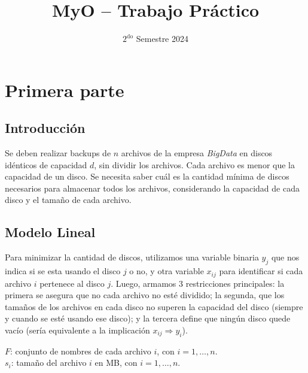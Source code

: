 \documentclass[11pt, a4paper, pdftex]{article}
\title{
	\huge MyO -- Trabajo Práctico\\
}
\author{
	\Mati \and \Xime \and \Lucifer \and \Lu
}
\date{\small $\text{2}^{\text{do}}$ Semestre 2024
}
\begin{document}
\renewcommand{\contentsname}{Contenidos}
\renewcommand{\listfigurename}{Listado de Figuras}
\renewcommand{\listtablename}{Listado de Tablas}
\renewcommand{\tablename}{Tabla}

\newcommand{\minimize}{\texttt{Minimize}\quad\,\,}
\newcommand{\maximize}{\texttt{Maximize}\quad\,\,}
\newcommand{\subjto}{\texttt{Subject to}\quad}

\maketitle

\tableofcontents

\newpage

\section{Primera parte}

\subsection{Introducción}

Se deben realizar backups de $n$ archivos de la empresa \emph{BigData}
en discos idénticos de capacidad $d$, sin dividir los archivos. Cada
archivo es menor que la capacidad de un disco. Se necesita saber cuál es
la cantidad mínima de discos necesarios para almacenar todos los
archivos, considerando la capacidad de cada disco y el tamaño de cada
archivo. 

\subsection{Modelo Lineal}

Para minimizar la cantidad de discos, utilizamos una variable binaria
$y_{j}$ que nos indica si se esta usando el disco $j$ o no, y otra
variable $x_{ij}$ para identificar si cada archivo $i$ pertenece al
disco $j$. Luego, armamos 3 restricciones principales: la primera se
asegura que no cada archivo no esté dividido; la segunda, que los
tamaños de los archivos en cada disco no superen la capacidad del disco
(siempre y cuando se esté usando ese disco); y la tercera define que
ningún disco quede vacío (sería equivalente a la implicación $x_{ij}
\Rightarrow y_i$).

$F$: conjunto de nombres de cada archivo $i$, con $i = 1, \ldots, n$. \\

$s_{i}$: tamaño del archivo $i$ en MB, con $i = 1, \ldots, n$. \\
\end{document}
